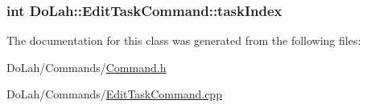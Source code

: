 \subsubsection[{task\+Index}]{\setlength{\rightskip}{0pt plus 5cm}int Do\+Lah\+::\+Edit\+Task\+Command\+::task\+Index\hspace{0.3cm}{\ttfamily [private]}}\label{class_do_lah_1_1_edit_task_command_a8b5c93a931c3a5f8f843d36c2be33f28}


The documentation for this class was generated from the following files\+:\begin{DoxyCompactItemize}
\item 
Do\+Lah/\+Commands/\hyperlink{_command_8h}{Command.\+h}\item 
Do\+Lah/\+Commands/\hyperlink{_edit_task_command_8cpp}{Edit\+Task\+Command.\+cpp}\end{DoxyCompactItemize}
